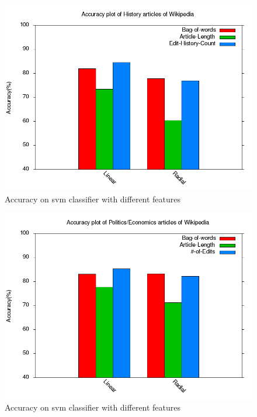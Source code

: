 \documentclass[twocolumn]{article}
\begin{document}
 

 \begin{figure}[t]
         \centering
         \includegraphics[width=0.95\columnwidth]{accuracy_plot.png}
         \caption{Accuracy on svm classifier with different features}
         \label{fig:1}
 \end{figure}
 \begin{figure}[Politics/Economics]
         \centering
         \includegraphics[width=0.95\columnwidth]{accuracy_plot2.png}
         \caption{Accuracy on svm classifier with different features}
         \label{fig:2}
 \end{figure}
\end{document}
